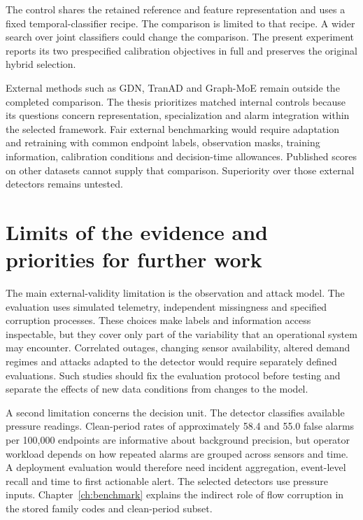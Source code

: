The control shares the retained reference and feature representation and uses a fixed temporal-classifier recipe. The comparison is limited to that recipe. A wider search over joint classifiers could change the comparison. The present experiment reports its two prespecified calibration objectives in full and preserves the original hybrid selection.

External methods such as GDN, TranAD and Graph-MoE remain outside the completed comparison. The thesis prioritizes matched internal controls because its questions concern representation, specialization and alarm integration within the selected framework. Fair external benchmarking would require adaptation and retraining with common endpoint labels, observation masks, training information, calibration conditions and decision-time allowances. Published scores on other datasets cannot supply that comparison. Superiority over those external detectors remains untested.

\section{Limits of the evidence and priorities for further work}
The main external-validity limitation is the observation and attack model. The evaluation uses simulated telemetry, independent missingness and specified corruption processes. These choices make labels and information access inspectable, but they cover only part of the variability that an operational system may encounter. Correlated outages, changing sensor availability, altered demand regimes and attacks adapted to the detector would require separately defined evaluations. Such studies should fix the evaluation protocol before testing and separate the effects of new data conditions from changes to the model.

A second limitation concerns the decision unit. The detector classifies available pressure readings. Clean-period rates of approximately 58.4 and 55.0 false alarms per 100,000 endpoints are informative about background precision, but operator workload depends on how repeated alarms are grouped across sensors and time. A deployment evaluation would therefore need incident aggregation, event-level recall and time to first actionable alert. The selected detectors use pressure inputs. Chapter~\ref{ch:benchmark} explains the indirect role of flow corruption in the stored family codes and clean-period subset.

